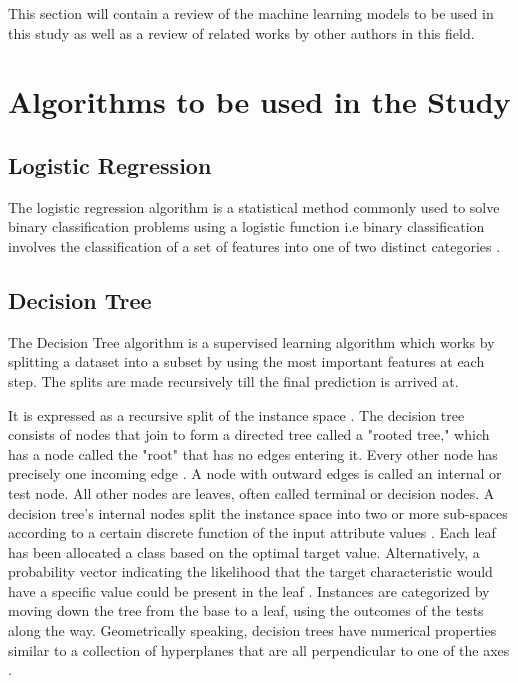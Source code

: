 \documentclass[12pt, a4paper,twoside]{report}
\numberwithin{equation}{chapter}
\begin{document}
This section will contain a review of the machine learning models to be used in this study as well as a review of related works by other authors in this field.

\section{Algorithms to be used in the Study}

\subsection{Logistic Regression}
The logistic regression algorithm is a statistical method commonly used to solve binary classification problems using a logistic function i.e binary classification involves the classification of a set of features into one of two distinct categories \parencite{Wikipedia_2024}. 

\subsection{Decision Tree}
The Decision Tree algorithm \parencite{Quinlan1986Induction} is a supervised learning algorithm which works by splitting a dataset into a subset by using the most important features at each step. The splits are made recursively till the final prediction is arrived at.

It is expressed as a recursive split of the instance space \parencite{cadena-2016}. The decision tree consists of nodes that join to form a directed tree called a "rooted tree," which has a node called the "root" that has no edges entering it. Every other node has precisely one incoming edge \parencite{dao-tran-2015}. A node with outward edges is called an internal or test node. All other nodes are leaves, often called terminal or decision nodes. A decision tree's internal nodes split the instance space into two or more sub-spaces according to a certain discrete function of the input attribute values \parencite{pratola-2016}. Each leaf has been allocated a class based on the optimal target value. Alternatively, a probability vector indicating the likelihood that the target characteristic would have a specific value could be present in the leaf \parencite{van-engelen-2019}. Instances are categorized by moving down the tree from the base to a leaf, using the outcomes of the tests along the way. Geometrically speaking, decision trees have numerical properties similar to a collection of hyperplanes that are all perpendicular to one of the axes \parencite{basu-2023}.
\end{document}
